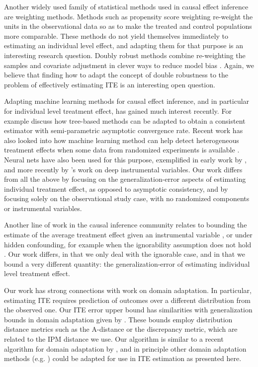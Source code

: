 \documentclass{article}
\begin{document}
Another widely used family of statistical methods used in causal effect inference are weighting methods. Methods such as propensity score weighting \citep{austin2011introduction} re-weight the units in the observational data so as to make the treated and control populations more comparable. These methods do not yield themselves immediately to estimating an individual level effect, and adapting them for that purpose is an interesting research question.
Doubly robust methods combine re-weighting the samples and covariate adjustment in clever ways to reduce model bias \citep{funk2011doubly}. Again, we believe that finding how to adapt the concept of double robustness to the problem of effectively estimating ITE is an interesting open question.


Adapting machine learning methods for causal effect inference, and in particular for individual level treatment effect, has gained much interest recently. For example \citet{wager2015estimation,athey2016recursive} discuss how tree-based methods can be adapted to obtain a consistent estimator with semi-parametric asymptotic convergence rate. Recent work has also looked into how machine learning method can help detect heterogeneous treatment effects when some data from randomized experiments is available \citep{taddy2016nonparametric,peysakhovich2016combining}.
Neural nets have also been used for this purpose, exemplified in early work by \citet{beck2000improving}, and more recently by \citet{hartford2016counterfactual}'s work on deep instrumental variables.
Our work differs from all the above by focusing on the generalization-error aspects of estimating individual treatment effect, as opposed to asymptotic consistency, and by focusing solely on the observational study case, with no randomized components or instrumental variables.

Another line of work in the causal inference community relates to bounding the estimate of the average treatment effect given an instrumental variable \citep{balke1997bounds,bareinboim2012controlling}, or under hidden confounding, for example when the ignorability assumption does not hold \citep{pearl2009causality,cai2008bounds}. Our work differs, in that we only deal with the ignorable case, and in that we bound a very different quantity: the generalization-error of estimating individual level treatment effect.

Our work has strong connections with work on domain adaptation. In particular, estimating ITE requires prediction of outcomes over a different distribution from the observed one. Our ITE error upper bound has similarities with generalization bounds in domain adaptation given by \citet{ben2007analysis,mansour2009bdomain,bendavid2010theory,cortes2014domain}.
These bounds employ distribution distance metrics such as the A-distance or the discrepancy metric, which are related to the IPM distance we use. Our algorithm is similar to a recent algorithm for domain adaptation by \citet{JMLR:v17:15-239}, and in principle other domain adaptation methods (e.g. \citet{daume2009frustratingly,pan2011domain,sun2016return}) could be adapted for use in ITE estimation as presented here.
\end{document}

